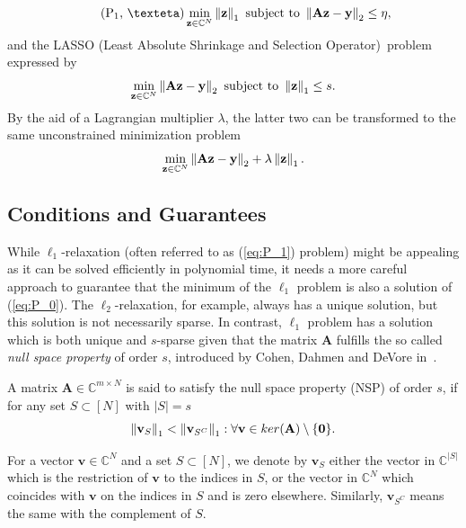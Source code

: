 \begin{equation}
    \tag{P\textsubscript{1}, \texteta}\label{eq:P_1_noisy}
    \min_{\mathbf{z} \in \mathbb{C}^N} \norm{\mathbf{z}}_1 \text{ subject to } \norm{\mathbf{Az} - \mathbf{y}}_2 \le \eta,
\end{equation}
and the LASSO (Least Absolute Shrinkage and Selection Operator)~\citationneeded problem expressed by
\[\min_{\mathbf{z} \in \mathbb{C}^N} \left\lVert\mathbf{Az} - \mathbf{y}\right\rVert_2 \text{ subject to } \left\lVert\mathbf{z}\right\rVert_1 \le s.\]
By the aid of a Lagrangian multiplier $\lambda$, the latter two can be transformed to the same unconstrained minimization problem
\[\min_{\mathbf{z} \in \mathbb{C}^N} \left\lVert\mathbf{Az} - \mathbf{y}\right\rVert_2 + \lambda \left\lVert\mathbf{z}\right\rVert_1.\]

\subsection{Conditions and Guarantees}
While $\ell_1$-relaxation (often referred to as (\ref{eq:P_1}) problem) might be appealing as it can be solved efficiently in polynomial time, it needs a more careful approach to guarantee that the minimum of the $\ell_1$ problem is also a solution of (\ref{eq:P_0}). The $\ell_2$-relaxation, for example, always has a unique solution, but this solution is not necessarily sparse. In contrast, $\ell_1$ problem has a solution which is both unique and $s$-sparse given that the matrix $\mathbf{A}$ fulfills the so called \textit{null space property} of order $s$, introduced by Cohen, Dahmen and DeVore in~\cite{cohen_compressed_2009}.

\begin{definition}[NSP]
A matrix $\mathbf{A} \in \mathbb{C}^{m \times N}$ is said to satisfy the null space property (NSP) of order $s$, if for any set $S \subset [N]$ with $|S| = s$
\[\left\lVert\mathbf{v}_S\right\rVert_1 < \left\lVert\mathbf{v}_{S^C}\right\rVert_1 : \forall \mathbf{v} \in ker(\mathbf{A})  \setminus \{\mathbf{0}\}.\]
\end{definition}

\begin{notation}
For a vector $\mathbf{v} \in \mathbb{C}^N$ and a set $S \subset [N]$, we denote by $\mathbf{v}_S$ either the vector in $\mathbb{C}^{|S|}$ which is the restriction of $\mathbf{v}$ to the indices in $S$, or the vector in $\mathbb{C}^N$ which coincides with $\mathbf{v}$ on the indices in $S$ and is zero elsewhere. Similarly, $\mathbf{v}_{S^C}$ means the same with the complement of $S$.
\end{notation}

